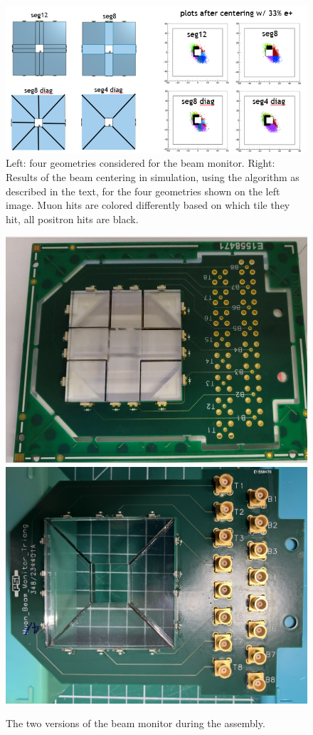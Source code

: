 \begin{refsection}
        \begin{figure}
            \centering
            \includegraphics[width=0.8\linewidth]{Figures/muEDM/BeamMonitor/BeamMonConfigurations.png}
            \caption[muEDM: Beam monitor sketch and simulations]{Left: four geometries considered for the beam monitor. Right: Results of the beam centering in simulation, using the algorithm as described in the text, for the four geometries shown on the left image. Muon hits are colored differently based on which tile they hit, all positron hits are black.}
            \label{fig:BeamMonSimCentering}
        \end{figure}
        
        \begin{figure}
            \centering
            \includegraphics[width=0.4\linewidth]{Figures/muEDM/BeamMonitor/BeamMonRect.png}
            \hspace{0.8cm}
            \includegraphics[width=0.4\linewidth]{Figures/muEDM/BeamMonitor/BeamMonTriang4.png}
            
            \caption[muEDM: Beam monitor versions]{The two versions of the beam monitor during the assembly.}
            \label{fig:BeamMonAssembly}
        \end{figure}
        

\end{refsection}
